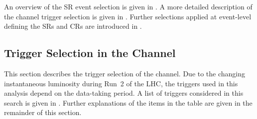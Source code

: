 An overview of the SR event selection is given in . A
more detailed description of the \hadhad channel trigger selection is given in
. Further selections applied at event-level
defining the SRs and CRs are introduced in .

\begin{table}[htbp]
  \centering

  \caption{SR event selection for the \hadhad, \lephad SLT, and \lephad LTT
    channel. Trigger-dependent thresholds are applied to the \pT of electrons,
    muons, and \tauhadvis. Where applicable, the range of these thresholds is
    listed. For events selected by DTTs and LTTs, the requirements on jets in
    the central region are trigger-dependent, and thus not given in this
    table. For the \hadhad channel, these requirements are described in
    . Jets in the forward region are not used
    for event selection purposes.
    The table is adapted from Ref.~\cite{HDBS-2018-40}.}%
  \label{tab:event_selection}

  \resizebox{\textwidth}{!}{
    
  }
\end{table}


\subsection{Trigger Selection in the \hadhad Channel}%
\label{sec:trigger}%
\label{sec:hadhad_trigger_selection}

This section describes the trigger selection of the \hadhad channel. Due to the
changing instantaneous luminosity during Run~2 of the LHC, the triggers used in
this analysis depend on the data-taking period. A list of triggers considered in
this search is given in . Further explanations of the
items in the table are given in the remainder of this section.

